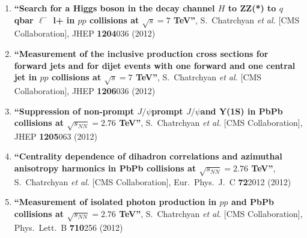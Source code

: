 \begin{enumerate}
\item%
{\bf ``Search for a Higgs boson in the decay channel $H$ to ZZ(*) to $q$ qbar $\ell^-$ l+ in $pp$ collisions at $\sqrt{s}=7$ TeV''}, 
  S.~Chatrchyan {\it et al.}  [CMS Collaboration], 
JHEP {\bf 1204}036 (2012) %


\item%
{\bf ``Measurement of the inclusive production cross sections for forward jets and for dijet events with one forward and one central jet in $pp$ collisions at $\sqrt{s}=7$ TeV''}, 
  S.~Chatrchyan {\it et al.}  [CMS Collaboration], 
JHEP {\bf 1206}036 (2012) %


\item%
{\bf ``Suppression of non-prompt $J/\psi$prompt $J/\psi$and Y(1S) in PbPb collisions at $\sqrt{s_{NN}}=2.76$ TeV''}, 
  S.~Chatrchyan {\it et al.}  [CMS Collaboration], 
JHEP {\bf 1205}063 (2012) %


\item%
{\bf ``Centrality dependence of dihadron correlations and azimuthal anisotropy harmonics in PbPb collisions at $\sqrt{s_{NN}}=2.76$ TeV''}, 
  S.~Chatrchyan {\it et al.}  [CMS Collaboration], 
Eur.\ Phys.\ J.\ C {\bf 72}2012 (2012) %


\item%
{\bf ``Measurement of isolated photon production in $pp$ and PbPb collisions at $\sqrt{s_{NN}}=2.76$ TeV''}, 
  S.~Chatrchyan {\it et al.}  [CMS Collaboration], 
Phys.\ Lett.\ B {\bf 710}256 (2012) %



\end{enumerate}
